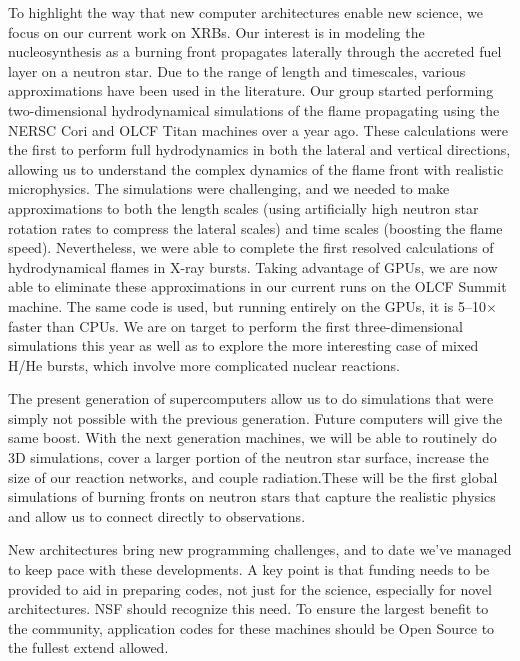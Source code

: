 \documentclass[11pt]{article}
\begin{document}
To highlight the way that new computer architectures enable new
science, we focus on our current work on XRBs.  Our interest is in
modeling the nucleosynthesis as a burning front propagates laterally
through the accreted fuel layer on a neutron star.  Due to the range
of length and timescales, various approximations have been used in the
literature.  Our group started performing two-dimensional
hydrodynamical simulations of the flame propagating using the NERSC
Cori and OLCF Titan machines over a year ago.  These calculations were
the first to perform full hydrodynamics in both the lateral and
vertical directions, allowing us to understand the complex dynamics of
the flame front with realistic microphysics.  The simulations were
challenging, and we needed to make approximations to both the length
scales (using artificially high neutron star rotation rates to compress
the lateral scales) and time scales (boosting the flame speed).
Nevertheless, we were able to complete the first resolved calculations
of hydrodynamical flames in X-ray bursts.  Taking advantage of GPUs,
we are now able to eliminate these approximations in our current runs on the
OLCF Summit machine.  The same code is used,
but running entirely on the GPUs, it is 5--10$\times$ faster than
CPUs.  We are on target to perform the first three-dimensional
simulations this year as well as to explore the more interesting case
of mixed H/He bursts, which involve more complicated nuclear
reactions.

The present generation of supercomputers allow us to do simulations
that were simply not possible with the previous generation.  Future
computers will give the same boost.  With the next generation
machines, we will be able to routinely do 3D simulations, cover a
larger portion of the neutron star surface, increase the size of our
reaction networks, and couple radiation.These will be the first global
simulations of burning fronts on neutron stars that capture the
realistic physics and allow us to connect directly to observations.

New architectures bring new programming challenges, and to date we've
managed to keep pace with these developments.  A key point is that
funding needs to be provided to aid in preparing codes, not just for
the science, especially for novel architectures.  NSF should recognize
this need.  To ensure the largest benefit to the community,
application codes for these machines should be Open Source to the
fullest extend allowed.
\end{document}
